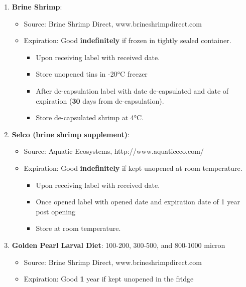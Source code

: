 \documentclass[
  letterpaper,
  DIV=11,
  numbers=noendperiod]{scrreprt}
\providecommand{\tightlist}{%
  \setlength{\itemsep}{0pt}\setlength{\parskip}{0pt}}\usepackage{longtable,booktabs,array}
\begin{document}
\begin{enumerate}
\def\labelenumi{\arabic{enumi}.}
\item
  \textbf{Brine Shrimp}:

  \begin{itemize}
  \tightlist
  \item
    Source: Brine Shrimp Direct, www.brineshrimpdirect.com
  \item
    Expiration: Good \textbf{indefinitely} if frozen in tightly sealed
    container.

    \begin{itemize}
    \tightlist
    \item
      Upon receiving label with received date.
    \item
      Store unopened tins in -20°C freezer
    \item
      After de-capsulation label with date de-capsulated and date of
      expiration (\textbf{30} days from de-capsulation).
    \item
      Store de-capsulated shrimp at 4°C.
    \end{itemize}
  \end{itemize}
\item
  \textbf{Selco (brine shrimp supplement)}:

  \begin{itemize}
  \tightlist
  \item
    Source: Aquatic Ecosystems, http://www.aquaticeco.com/
  \item
    Expiration: Good \textbf{indefinitely} if kept unopened at room
    temperature.

    \begin{itemize}
    \tightlist
    \item
      Upon receiving label with received date.
    \item
      Once opened label with opened date and expiration date of 1 year
      post opening
    \item
      Store at room temperature.
    \end{itemize}
  \end{itemize}
\item
  \textbf{Golden Pearl Larval Diet}: 100-200, 300-500, and 800-1000
  micron

  \begin{itemize}
  \tightlist
  \item
    Source: Brine Shrimp Direct, www.brineshrimpdirect.com
  \item
    Expiration: Good \textbf{1} year if kept unopened in the fridge


\end{itemize}
\end{enumerate}
\end{document}
